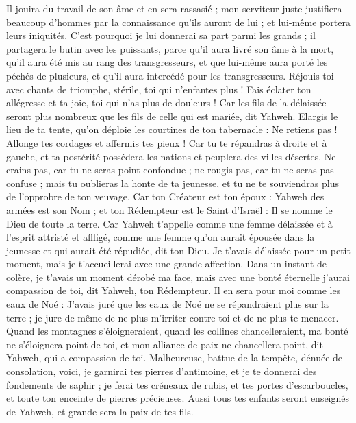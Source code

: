 \begin{multicols}{2}
Il jouira du travail de son âme et en sera rassasié ; mon serviteur juste justifiera beaucoup d'hommes par la connaissance qu'ils auront de lui ; et lui-même portera leurs iniquités.
C'est pourquoi je lui donnerai sa part parmi les grands ; il partagera le butin avec les puissants, parce qu'il aura livré son âme à la mort, qu'il aura été mis au rang des transgresseurs, et que lui-même aura porté les péchés de plusieurs, et qu'il aura intercédé pour les transgresseurs.
\VerseOne{}Réjouis-toi avec chants de triomphe, stérile, toi qui n'enfantes plus ! Fais éclater ton allégresse et ta joie, toi qui n'as plus de douleurs ! Car les fils de la délaissée seront plus nombreux que les fils de celle qui est mariée, dit Yahweh.
Elargis le lieu de ta tente, qu'on déploie les courtines de ton tabernacle : Ne retiens pas ! Allonge tes cordages et affermis tes pieux !
Car tu te répandras à droite et à gauche, et ta postérité possédera les nations et peuplera des villes désertes.
Ne crains pas, car tu ne seras point confondue ; ne rougis pas, car tu ne seras pas confuse ; mais tu oublieras la honte de ta jeunesse, et tu ne te souviendras plus de l'opprobre de ton veuvage.
Car ton Créateur est ton époux : Yahweh des armées est son Nom ; et ton Rédempteur est le Saint d'Israël : Il se nomme le Dieu de toute la terre.
Car Yahweh t'appelle comme une femme délaissée et à l'esprit attristé et affligé, comme une femme qu'on aurait épousée dans la jeunesse et qui aurait été répudiée, dit ton Dieu.
Je t'avais délaissée pour un petit moment, mais je t'accueillerai avec une grande affection.
Dans un instant de colère, je t'avais un moment dérobé ma face, mais avec une bonté éternelle j'aurai compassion de toi, dit Yahweh, ton Rédempteur.
Il en sera pour moi comme les eaux de Noé : J'avais juré que les eaux de Noé ne se répandraient plus sur la terre ; je jure de même de ne plus m'irriter contre toi et de ne plus te menacer.
Quand les montagnes s'éloigneraient, quand les collines chancelleraient, ma bonté ne s'éloignera point de toi, et mon alliance de paix ne chancellera point, dit Yahweh, qui a compassion de toi.
Malheureuse, battue de la tempête, dénuée de consolation, voici, je garnirai tes pierres d'antimoine, et je te donnerai des fondements de saphir ;
je ferai tes créneaux de rubis, et tes portes d'escarboucles, et toute ton enceinte de pierres précieuses.
Aussi tous tes enfants seront enseignés de Yahweh, et grande sera la paix de tes fils.

\end{multicols}
